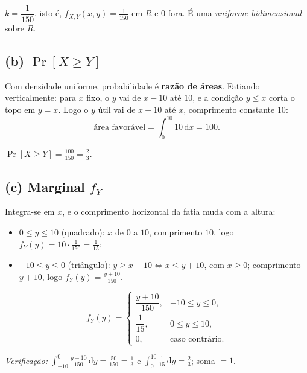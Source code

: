 \documentclass[11pt,a4paper]{article}
\newcommand{\dd}{\,\mathrm{d}}
\renewcommand{\Pr}{\operatorname{Pr}}
\begin{document}
\begin{resp}
$k=\dfrac{1}{150}$, isto é, $f_{X,Y}(x,y)=\frac{1}{150}$ em $R$ e $0$ fora.
É uma \emph{uniforme bidimensional} sobre $R$.
\end{resp}

\subsection*{(b) $\Pr[X\ge Y]$}

Com densidade uniforme, probabilidade é \textbf{razão de áreas}. Fatiando
verticalmente: para $x$ fixo, o $y$ vai de $x-10$ até $10$, e a condição $y\le x$
corta o topo em $y=x$. Logo o $y$ útil vai de $x-10$ até $x$, comprimento
constante $10$:
\[
\text{área favorável}=\int_0^{10} 10 \dd x = 100 .
\]

\begin{resp}
$\displaystyle \Pr[X\ge Y]=\frac{100}{150}=\frac23 .$
\end{resp}

\subsection*{(c) Marginal $f_Y$}

Integra-se em $x$, e o comprimento horizontal da fatia muda com a altura:
\begin{itemize}[nosep,leftmargin=*]
\item \textbf{$0\le y\le10$} (quadrado): $x$ de $0$ a $10$, comprimento $10$,
      logo $f_Y(y)=10\cdot\frac1{150}=\frac1{15}$;
\item \textbf{$-10\le y\le0$} (triângulo): $y\ge x-10 \Leftrightarrow x\le y+10$,
      com $x\ge0$; comprimento $y+10$, logo $f_Y(y)=\frac{y+10}{150}$.
\end{itemize}

\begin{resp}
\[
f_Y(y)=\begin{cases}
\dfrac{y+10}{150}, & -10\le y\le 0,\\[6pt]
\dfrac{1}{15}, & 0\le y\le 10,\\[4pt]
0, & \text{caso contrário.}
\end{cases}
\]
\end{resp}

\emph{Verificação:} $\int_{-10}^{0}\frac{y+10}{150}\dd y=\frac{50}{150}=\frac13$ e
$\int_0^{10}\frac1{15}\dd y=\frac23$; soma $=1$. \checkmark
\end{document}
